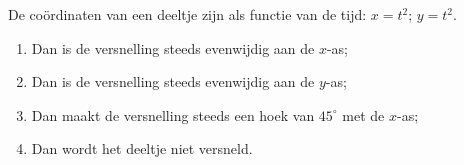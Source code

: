 

\item{}De co\"ordinaten van een deeltje zijn als functie van de tijd:
$x=t^2$; $y=t^2$.
\begin{enumerate}
\item Dan is de versnelling steeds evenwijdig aan de $x$-as;
\item Dan is de versnelling steeds evenwijdig aan de $y$-as;
\item Dan maakt de versnelling steeds een hoek van $45^\circ$ met de $x$-as;
\item Dan wordt het deeltje niet versneld.
\end{enumerate}